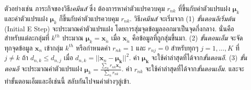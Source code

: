 ตัวอย่างเช่น ภาระกิจของวิธี\textit{เคมีนส์} ซึ่ง
ต้องการหาค่าตัวแปรควบคุม $r_{nk}$ ที่ขึ้นกับค่าตัวแปรแฝง $\bm{\mu}_k$
และค่าตัวแปรแฝง $\bm{\mu}_k$ ก็ขึ้นกับค่าตัวแปรควบคุม $r_{nk}$.
วิธี\textit{เคมีนส์} จะเริ่มจาก
(1) \textit{ขั้นตอนอีเริ่มต้น} (Initial E Step) จะประมาณค่าตัวแปรแฝง
โดยการสุ่มจุดข้อมูลออกมาเป็นจุดกึ่งกลาง.
นั่นคือ สำหรับแต่ละกลุ่มที่ $k^{th}$ ประมาณ  $\bm{\mu}_k = \bm{x}_{\tilde{n}}$ เมื่อ $\bm{x}_{\tilde{n}}$ คือข้อมูลที่ถูกสุ่มขึ้นมา.
(2) \textit{ขั้นตอนเอ็ม} จะจัดทุกจุดข้อมูล $\bm{x}_n$ เข้ากลุ่ม $k^{th}$
หรือกำหนดค่า $r_{nk} = 1$ และ $r_{nj} = 0$
สำหรับทุกๆ $j = 1, \ldots, K$ ที่ $j \neq k$
ถ้า
$d_{n,k} \leq d_{n,j}$ 
เมื่อ $d_{n,k} = ||\bm{x}_n - \bm{\mu_k}||^2$.
ค่า $\bm{\mu_k}$ จะใช้ค่าล่าสุดที่ได้จาก\textit{ขั้นตอนอี}.
(3) \textit{ขั้นตอนอี} จะประมาณค่าตัวแปรแฝง $\bm{\mu}_k = \frac{\sum_n r_{nk} \bm{x}_n}{\sum_n r_{nk}}$.
ค่า $r_{nk}$ จะใช้ค่าล่าสุดที่ได้จาก\textit{ขั้นตอนเอ็ม}.
และจะทำขั้นตอนเอ็มและอีเช่นนี้ สลับกันไปจนค่าต่างๆลู่เข้า.

%

%

%


%

